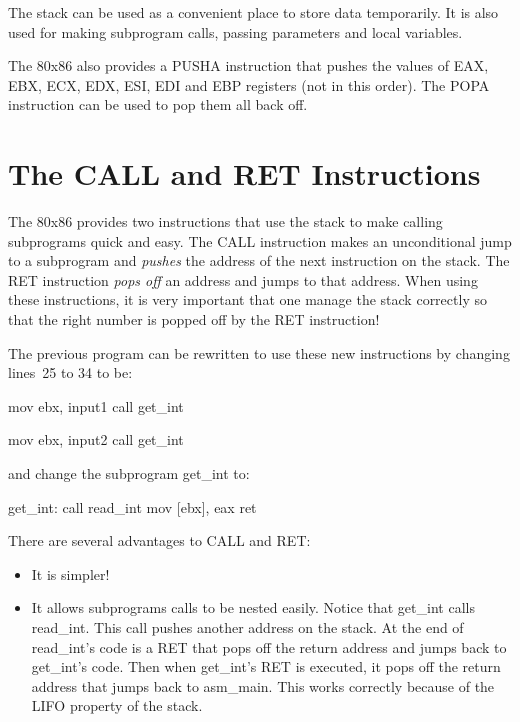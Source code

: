 The stack can be used as a convenient place to store data temporarily. It is
also used for making subprogram calls, passing parameters and local
variables.

The 80x86 also provides a {\code PUSHA} instruction that pushes the values
of EAX, EBX, ECX, EDX, ESI, EDI and EBP registers (not in this order). The
{\code POPA} instruction can be used to pop them all back off.

\section{The CALL and RET Instructions}
The 80x86 provides two instructions that use the stack to make calling
subprograms quick and easy. The CALL instruction makes an
unconditional jump to a subprogram and \emph{pushes} the address of
the next instruction on the stack. The RET instruction
\emph{pops off} an address and jumps to that address. When using these
instructions, it is very important that one manage the stack correctly
so that the right number is popped off by the RET instruction!

The previous program can be rewritten to use these new instructions by 
changing lines~25 to 34 to be:
\begin{AsmCodeListing}[numbers=none]
      mov    ebx, input1
      call   get_int

      mov    ebx, input2
      call   get_int
\end{AsmCodeListing}
and change the subprogram {\code get\_int} to:
\begin{AsmCodeListing}[numbers=none]
get_int:
      call   read_int
      mov    [ebx], eax
      ret
\end{AsmCodeListing}

There are several advantages to CALL and RET:
\begin{itemize}
\item It is simpler!
\item It allows subprograms calls to be nested easily. Notice that
{\code get\_int} calls {\code read\_int}. This call pushes another address
on the stack. At the end of {\code read\_int}'s code is a RET that pops
off the return address and jumps back to {\code get\_int}'s code. Then when
{\code get\_int}'s RET is executed, it pops off the return address that 
jumps back to {\code asm\_main}. This works correctly because of the LIFO
property of the stack.
\end{itemize}

